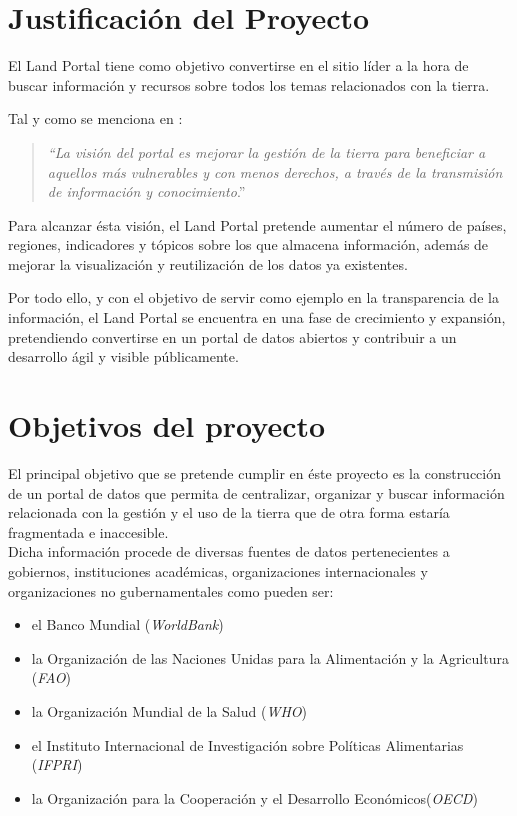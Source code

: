 \section{Justificación del Proyecto}
El Land Portal tiene como objetivo convertirse en el sitio líder a la hora de buscar información y recursos sobre todos los temas relacionados con la tierra.

Tal y como se menciona en \cite[página 5]{landportal-strategy}:
\begin{quote}
\textit{``La visión del portal es mejorar la gestión de la tierra para beneficiar a aquellos más vulnerables y con menos derechos, a través de la transmisión de información y conocimiento}.''
\end{quote}

Para alcanzar ésta visión, el Land Portal pretende aumentar el número de países, regiones, indicadores y tópicos sobre los que almacena información, además de mejorar la visualización y reutilización de los datos ya existentes.

Por todo ello, y con el objetivo de servir como ejemplo en la transparencia de la información, el Land Portal se encuentra en una fase de crecimiento y expansión, pretendiendo convertirse en un portal de datos abiertos y contribuir a un desarrollo ágil y visible públicamente.



\section{Objetivos del proyecto}
El principal objetivo que se pretende cumplir en éste proyecto es la construcción de un portal de datos que permita de centralizar, organizar y buscar información relacionada con la gestión y el uso de la tierra que de otra forma estaría fragmentada e inaccesible.\\
Dicha información procede de diversas fuentes de datos pertenecientes a gobiernos, instituciones académicas, organizaciones internacionales y organizaciones no gubernamentales como pueden ser:
\begin{itemize}
\item el Banco Mundial (\textit{WorldBank})
\item la Organización de las Naciones Unidas para la Alimentación y la Agricultura (\textit{FAO})
\item la Organización Mundial de la Salud (\textit{WHO})
\item el Instituto Internacional de Investigación sobre Políticas Alimentarias (\textit{IFPRI})
\item la Organización para la Cooperación y el Desarrollo Económicos(\textit{OECD})
\end{itemize}

